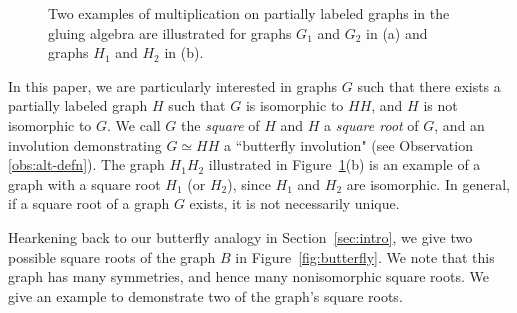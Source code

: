\documentclass{article}
\theoremstyle{definition}
\begin{document}
\begin{figure}[htb]
    \caption{Two examples of multiplication on partially labeled graphs in the gluing algebra are illustrated for graphs $G_1$ and $G_2$ in (a) and graphs $H_1$ and $H_2$ in (b).} \label{fig:gluing}
\end{figure}

In this paper, we are particularly interested in graphs $G$ such that there exists a partially labeled graph $H$ such that $G$ is isomorphic to $HH$, and $H$ is not isomorphic to $G$. We call $G$ the \textit{square} of $H$ and $H$ a \textit{square root} of $G$, and an involution demonstrating $G \simeq HH$ a ``butterfly involution" (see Observation \ref{obs:alt-defn}). The graph $H_1H_2$ illustrated in Figure~\ref{fig:gluing}(b) is an example of a graph with a square root $H_1$ (or $H_2$), since $H_1$ and $H_2$ are isomorphic. In general, if a square root of a graph $G$ exists, it is not necessarily unique.

Hearkening back to our butterfly analogy in Section~\ref{sec:intro}, we give two possible square roots of the graph $B$ in Figure~\ref{fig:butterfly}. We note that this graph has many symmetries, and hence many nonisomorphic square roots. We give an example to demonstrate two of the graph's square roots.
\end{document}
